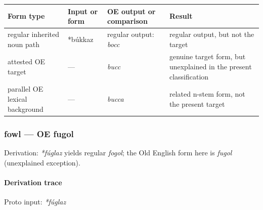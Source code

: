 \documentclass[
  british,
  a4paper,
]{article}
\newcounter{none} %
\begin{document}
{\def\LTcaptype{none} %
\begin{longtable}[]{@{}
  >{\raggedright\arraybackslash}p{}
  >{\raggedright\arraybackslash}p{}
  >{\raggedright\arraybackslash}p{}
  >{\raggedright\arraybackslash}p{}@{}}
\toprule\noalign{}
\begin{minipage}[b]{\linewidth}\raggedright
Form type
\end{minipage} & \begin{minipage}[b]{\linewidth}\raggedright
Input or form
\end{minipage} & \begin{minipage}[b]{\linewidth}\raggedright
OE output or comparison
\end{minipage} & \begin{minipage}[b]{\linewidth}\raggedright
Result
\end{minipage} \\
\midrule\noalign{}
\endhead
\bottomrule\noalign{}
\endlastfoot
regular inherited noun path & *búkkaz & regular output: \emph{bocc} &
regular output, but not the target \\
attested OE target & --- & \emph{bucc} & genuine target form, but
unexplained in the present classification \\
parallel OE lexical background & --- & \emph{bucca} & related n-stem
form, not the present target \\
\end{longtable}
}

\subsubsection{fowl --- OE fugol}\label{fowl-oe-fugol}

Derivation: \emph{*fúglaz} yields regular \emph{fogol}; the Old English
form here is \emph{fugol} (unexplained exception).

\paragraph{Derivation trace}\label{derivation-trace-73}

Proto input: \emph{*fúglaz}

\begingroup
\setlength{\fboxsep}{6pt}
\end{document}
